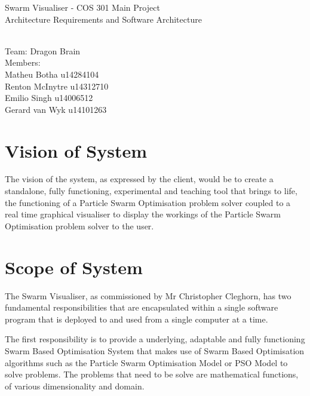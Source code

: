 \documentclass[11pt]{article}
\begin{document}
\begin{titlepage}

\begin{center}
\begin{huge}
Swarm Visualiser - COS 301 Main Project
\\
Architecture Requirements and Software Architecture
\begin{small}
\\
Team: Dragon Brain
\\
Members:
\\
Matheu Botha u14284104
\\
Renton McInytre u14312710
\\
Emilio Singh u14006512
\\
Gerard van Wyk u14101263

\end{small}

\end{huge}
\end{center}
\end{titlepage}

\pagebreak

\tableofcontents

\pagebreak
\section{Vision of System}
The vision of the system, as expressed by the client, would be to create a standalone, fully functioning, experimental and teaching tool that brings to life, the functioning of a Particle Swarm Optimisation problem solver coupled to a real time graphical visualiser to display the workings of the Particle Swarm Optimisation problem solver to the user.

\section{Scope of System}
The Swarm Visualiser, as commissioned by Mr Christopher Cleghorn, has two fundamental responsibilities that are encapsulated within a single software program that is deployed to and used from a single computer at a time.

The first responsibility is to provide a underlying, adaptable and fully functioning Swarm Based Optimisation System that makes use of Swarm Based Optimisation algorithms such as the Particle Swarm Optimisation Model or PSO Model to solve problems. The problems that need to be solve are mathematical functions, of various dimensionality and domain.
\end{document}
